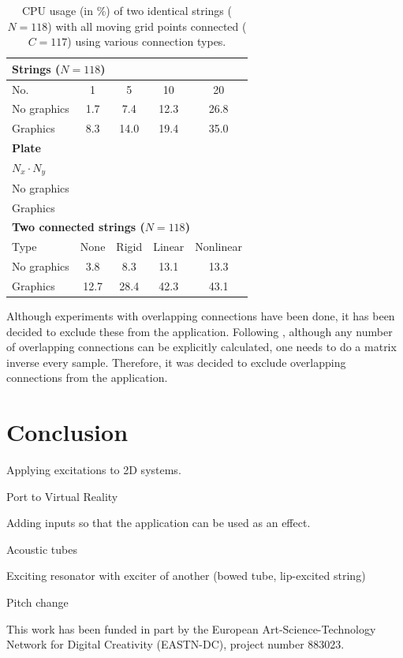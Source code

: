 \documentclass{article}
\begin{document}
\begin{table}[]
    \centering
    \begin{tabular}{|l|c|c|c|c|}
        \hline
    \multicolumn{5}{|l|}{\bf Strings ($N = 118$)}\\\hline
    No. & 1 & 5 & 10 & 20 \\\hline
    No graphics & 1.7 & 7.4 & 12.3 &26.8\\
    Graphics & 8.3 & 14.0  & 19.4 & 35.0\\\hline
    \multicolumn{5}{|l|}{\bf Plate}\\\hline
    $N_x \cdot N_y$& & & & \\\hline
    No graphics & & & &\\
    Graphics & & & &\\\hline
    \multicolumn{5}{|l|}{\bf Two connected strings ($N=118$)}\\\hline  
    Type & None & Rigid & Linear & Nonlinear \\\hline
        No graphics & 3.8 & 8.3 & 13.1 & 13.3\\
        Graphics & 12.7 & 28.4 & 42.3 & 43.1\\\hline
    \end{tabular}
    \caption{CPU usage (in \%) of two identical strings ($N=118$) with all moving grid points connected ($C = 117$) using various connection types.}
    \label{tab:CPU}
\end{table}



Although experiments with overlapping connections have been done, it has been decided to exclude these from the application. Following \cite{Bilbao2009Modular}, although any number of overlapping connections can be explicitly calculated, one needs to do a matrix inverse every sample. Therefore, it was decided to exclude overlapping connections from the application. 

\section{Conclusion}\label{sec:conclusion}

Applying excitations to 2D systems.

Port to Virtual Reality

Adding inputs so that the application can be used as an effect. 

Acoustic tubes

Exciting resonator with exciter of another (bowed tube, lip-excited string)

Pitch change


\begin{acknowledgments}
This work has been funded in part by the European Art-Science-Technology Network for Digital Creativity (EASTN-DC), project number 883023.
\end{acknowledgments} 

{\small

}
\end{document}

